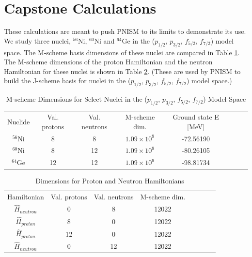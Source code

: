 \section{Capstone Calculations}
These calculations are meant to push PNISM to its limits to demonstrate its use.
We study three nuclei, $^{56}$Ni, $^{60}$Ni and $^{64}$Ge in the ($p_{1/2}$, $p_{3/2}$, $f_{5/2}$, $f_{7/2}$) 
model space. The M-scheme basis dimensions
of these nuclei are compared in Table \ref{mschemecap}.
The M-scheme dimensions of the proton Hamiltonian and the neutron Hamiltonian for
these nuclei is shown in Table \ref{jschemecap}. 
(These are used
by PNISM to build the J-scheme basis for nuclei in the ($p_{1/2}$, $p_{3/2}$, $f_{5/2}$, $f_{7/2}$) model
space.)

\begin{table}[h]
    \caption{M-scheme Dimensions for Select Nuclei in the ($p_{1/2}$, $p_{3/2}$, $f_{5/2}$, $f_{7/2}$) \hspace{\textwidth}Model
Space}
    \label{mschemecap}
\begin{tabular}
    {c c c c c c c c}
    \hline 
    \hline
Nuclide & Val. protons & Val. neutrons & M-scheme dim. & Ground state E [MeV] \\
$^{56}$Ni & 8 & 8 &   $1.09\times 10^9$ & -72.56190 \\  
$^{60}$Ni & 8 & 12 &  $1.09\times 10^9$ & -80.26105\\
$^{64}$Ge & 12 & 12 & $1.09\times 10^9$ & -98.81734\\
    \hline
    \hline
\end{tabular}
\end{table}
\begin{table}[h]
    \caption{Dimensions for Proton and Neutron Hamiltonians}
    \label{jschemecap}
\begin{tabular}
    {c c c c c c c c}
    \hline 
    \hline
Hamiltonian & Val. protons & Val. neutrons & M-scheme dim. \\
$\hat{H}_{neutron}$ & 0 & 8 &  12022 \\
$\hat{H}_{proton}$ & 8 & 0 &  12022 \\
$\hat{H}_{proton}$ & 12 & 0 & 12022 \\
$\hat{H}_{neutron}$ & 0 & 12 & 12022 \\
    \hline
    \hline
\end{tabular}
\end{table}

